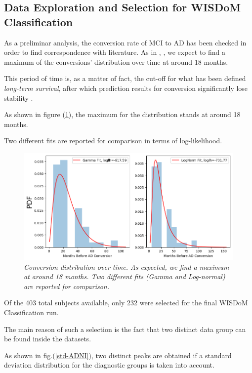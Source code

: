 \documentclass[12pt,openright,twoside,a4paper]{book}
\begin{document}
\subsection{Data Exploration and Selection for WISDoM Classification}

As a preliminar analysis, the conversion rate of MCI to AD has been checked in order to find correspondence with literature. As in \cite{conv}, \cite{conv2} , we expect to find a maximum of the conversions' distribution over time at around 18 months. 

This period of time is, as a matter of fact, the cut-off for what has been defined \textit{long-term survival}, after which prediction results for conversion significantly lose stability \cite{conv2}.

As shown in figure (\ref{conv-comp}), the maximum for the distribution stands at around 18 months.

Two different fits are reported for comparison in terms of log-likelihood.

\begin{figure}[!h]
\centering
\includegraphics[scale=0.65]{conv-comp}
\caption{\textit{Conversion distribution over time. As expected, we find a maximum at around 18 months. Two different fits (Gamma and Log-normal) are reported for comparison.}}
\label{conv-comp}
\end{figure}

\vspace{5mm}

Of the 403 total subjects available, only 232 were selected for the final WISDoM Classification run.

The main reason of such a selection is the fact that two distinct data group can be found inside the datasets.

As shown in fig.(\ref{std-ADNI}), two distinct peaks are obtained if a standard deviation distribution for the diagnostic groups is taken into account.
\end{document}
